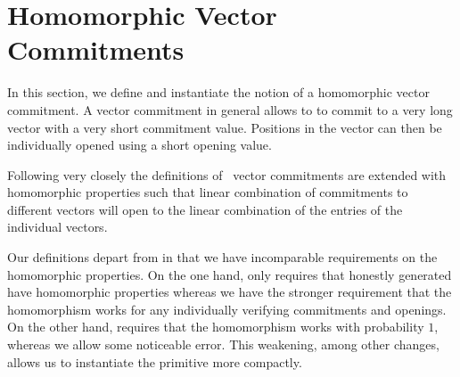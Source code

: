 \section{Homomorphic Vector Commitments}\label{sec:veccom}

In this section, we define and instantiate the notion of a homomorphic vector commitment.
A vector commitment in general allows to to commit to a very long vector with a very short commitment value.
Positions in the vector can then be individually opened using a short opening value.

Following very closely the definitions of~\cite{CCS:FleSimZha22} vector commitments are extended with homomorphic properties such that linear combination of commitments to different vectors will open to the linear combination of the entries of the individual vectors.

Our definitions depart from \cite{CCS:FleSimZha22} in that we have incomparable requirements on the homomorphic properties.
On the one hand, \cite{CCS:FleSimZha22} only requires that honestly generated have homomorphic properties whereas we have the stronger requirement that the homomorphism works for any individually verifying commitments and openings.
On the other hand, \cite{CCS:FleSimZha22} requires that the homomorphism works with probability $1$, whereas we allow some noticeable error.
This weakening, among other changes, allows us to instantiate the primitive more compactly.

